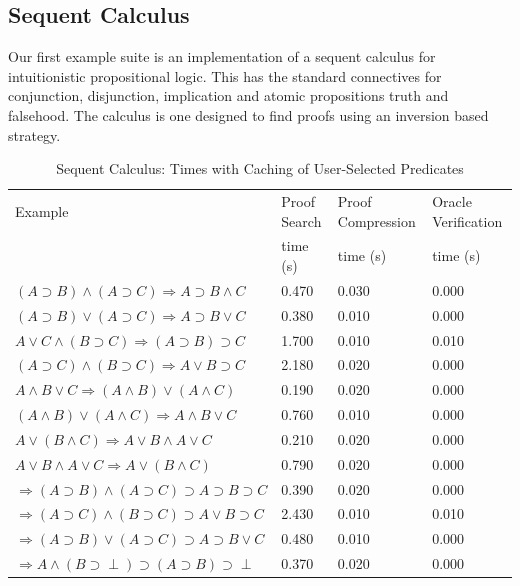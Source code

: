 \documentclass{acmconf}
\begin{document}
\subsection{Sequent Calculus}
Our first example suite is an implementation of a sequent calculus 
for intuitionistic propositional logic. This has the standard connectives
for conjunction, disjunction, implication and atomic propositions 
truth and falsehood. The calculus is one designed to find proofs using an 
inversion based strategy.

\begin{table}[htbp]
\begin{center}
\begin{small}
\begin{tabular}{|l|l|l|l|}
\hline
Example & Proof Search & Proof Compression & Oracle Verification \\
& time (s) & time (s) & time (s)\\
\hline
$(A\supset B)\wedge (A\supset C)\Rightarrow A\supset B\wedge C$
&	0.470 
&	0.030 
&	0.000 \\
$(A\supset B)\vee (A\supset C)\Rightarrow A\supset B\vee C$
&	0.380 
&	0.010 
&	0.000 \\
$A\vee C\wedge (B\supset C)\Rightarrow (A\supset B)\supset C$
&	1.700 
&	0.010 
&	0.010 \\
$(A\supset C)\wedge (B\supset C)\Rightarrow A\vee B\supset C$
&	2.180 
&	0.020 
&	0.000 \\
$A\wedge B\vee C\Rightarrow (A\wedge B)\vee (A\wedge C)$
&	0.190 
&	0.020 
&	0.000 \\
$(A\wedge B)\vee (A\wedge C)\Rightarrow A\wedge B\vee C$
&	0.760 
&	0.010 
&	0.000 \\
$A\vee (B\wedge C)\Rightarrow A\vee B\wedge A\vee C$
&	0.210 
&	0.020 
&	0.000 \\
$A\vee B\wedge A\vee C\Rightarrow A\vee (B\wedge C)$
&	0.790 
&	0.020 
&	0.000 \\
$\Rightarrow (A\supset B)\wedge (A\supset C)\supset A\supset B\supset C$
&	0.390 
&	0.020 
&	0.000 \\
$\Rightarrow (A\supset C)\wedge (B\supset C)\supset A\vee B\supset C$
&	2.430 
&	0.010 
&	0.010 \\
$\Rightarrow (A\supset B)\vee (A\supset C)\supset A\supset B\vee C$
&	0.480 
&	0.010 
&	0.000 \\
$\Rightarrow A\wedge (B\supset \perp)\supset (A\supset B)\supset \perp$ 
&	0.370 
&	0.020 
&	0.000 \\
\hline
\end{tabular}
\end{small}
\end{center}
\caption{\label{tab:seqtimes}
Sequent Calculus: Times with Caching of User-Selected Predicates}
\end{table}
\end{document}
